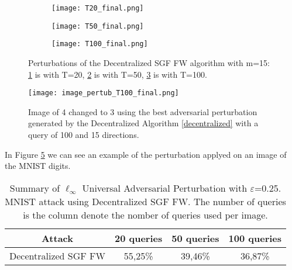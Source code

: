 \begin{figure}
	\centering
	\begin{subfigure}[b]{0.15\textwidth}
		\centering
		\texttt{[image: T20\_final.png]}
		\caption{}
		\label{fig:decentralized_perturbation_20}
	\end{subfigure}
	\hfill
	\begin{subfigure}[b]{0.15\textwidth}
		\texttt{[image: T50\_final.png]}
		\caption{}
		\label{fig:decentralized_perturbation_50}
	\end{subfigure}
	\hfill
	\begin{subfigure}[b]{0.15\textwidth}
		\texttt{[image: T100\_final.png]}
		\caption{}
		\label{fig:decentralized_perturbation_100}
	\end{subfigure}
	\caption{Perturbations of the Decentralized SGF FW algorithm with m=15: \ref{fig:decentralized_perturbation_20} is with T=20, \ref{fig:decentralized_perturbation_50} is with T=50,  \ref{fig:decentralized_perturbation_100} is with T=100.}
	\label{fig:decentralized_perturbations}
\end{figure}
\begin{figure}[h]
	\centering
	\texttt{[image: image\_pertub\_T100\_final.png]}
	\caption{Image of 4 changed to 3 using the best adversarial perturbation generated by the Decentralized Algorithm \ref{decentralized} with a query of 100 and 15 directions.}
	\label{fig:decentralized}
\end{figure}
In Figure \ref{fig:decentralized} we can see an example of the perturbation applyed on an image of the MNIST digits.

\begin{table}[htbp]
	\begin{center}
		\begin{adjustwidth}{-.6cm}{}
			\begin{tabular}{cccc}
				\textbf{Attack} &          20 \textbf{queries} &      50 \textbf{queries} &     100 \textbf{queries} \\
				\midrule
				{\small Decentralized SGF FW}     &    55,25\% &    39,46\% &       36,87\% \\
			\end{tabular}
		\end{adjustwidth}
	\end{center}
	\caption{{\small Summary of $\ell_\infty$ Universal Adversarial Perturbation with $\varepsilon$=0.25. MNIST attack using Decentralized SGF FW. The number of queries is the column denote the nomber of queries used per image.}}
	\label{tab:decentralized}
\end{table}